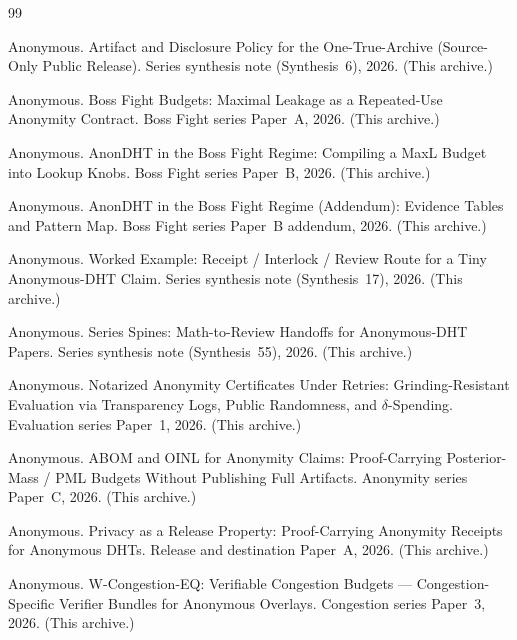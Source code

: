 \documentclass[11pt]{article}
\begin{document}
\begin{thebibliography}{99}\small

Anonymous.
\newblock Artifact and Disclosure Policy for the One-True-Archive (Source-Only Public Release).
\newblock Series synthesis note (Synthesis~6), 2026. (This archive.)

Anonymous.
\newblock Boss Fight Budgets: Maximal Leakage as a Repeated-Use Anonymity Contract.
\newblock Boss Fight series Paper~A, 2026. (This archive.)

Anonymous.
\newblock AnonDHT in the Boss Fight Regime: Compiling a MaxL Budget into Lookup Knobs.
\newblock Boss Fight series Paper~B, 2026. (This archive.)

Anonymous.
\newblock AnonDHT in the Boss Fight Regime (Addendum): Evidence Tables and Pattern Map.
\newblock Boss Fight series Paper~B addendum, 2026. (This archive.)

Anonymous.
\newblock Worked Example: Receipt / Interlock / Review Route for a Tiny Anonymous-DHT Claim.
\newblock Series synthesis note (Synthesis~17), 2026. (This archive.)

Anonymous.
\newblock Series Spines: Math-to-Review Handoffs for Anonymous-DHT Papers.
\newblock Series synthesis note (Synthesis~55), 2026. (This archive.)

Anonymous.
\newblock Notarized Anonymity Certificates Under Retries: Grinding-Resistant Evaluation via Transparency Logs, Public Randomness, and $\delta$-Spending.
\newblock Evaluation series Paper~1, 2026. (This archive.)

Anonymous.
\newblock ABOM and OINL for Anonymity Claims: Proof-Carrying Posterior-Mass / PML Budgets Without Publishing Full Artifacts.
\newblock Anonymity series Paper~C, 2026. (This archive.)

Anonymous.
\newblock Privacy as a Release Property: Proof-Carrying Anonymity Receipts for Anonymous DHTs.
\newblock Release and destination Paper~A, 2026. (This archive.)

Anonymous.
\newblock W-Congestion-EQ: Verifiable Congestion Budgets --- Congestion-Specific Verifier Bundles for Anonymous Overlays.
\newblock Congestion series Paper~3, 2026. (This archive.)

\end{thebibliography}
\end{document}
